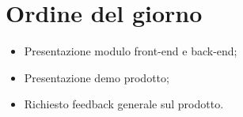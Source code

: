 \section{Ordine del giorno}

\begin{itemize}
\item Presentazione modulo front-end e back-end;
\item Presentazione demo prodotto;
\item Richiesto feedback generale sul prodotto.
\end{itemize}